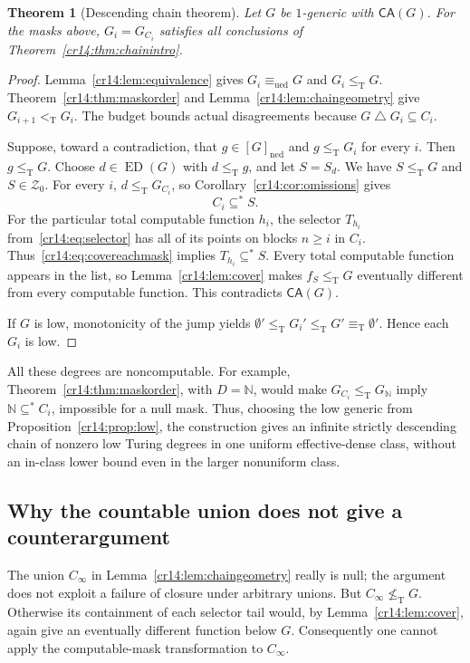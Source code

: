 \documentclass[11pt,a4paper]{article}
\newcommand{\N}{\mathbb N}
\newcommand{\leT}{\leq_{\mathrm T}}
\newcommand{\nleT}{\nleq_{\mathrm T}}
\newcommand{\eqT}{\equiv_{\mathrm T}}
\newcommand{\ltT}{<_{\mathrm T}}
\newcommand{\ned}{\mathrm{ned}}
\newcommand{\ued}{\mathrm{ued}}
\newcommand{\eqU}{\equiv_{\ued}}
\newcommand{\ED}{\operatorname{ED}}
\newcommand{\Znull}{\mathcal Z_0}
\newcommand{\substar}{\subseteq^{*}}
\newcommand{\symdiff}{\mathbin{\triangle}}
\newcommand{\jumpzero}{\emptyset'}
\newcommand{\CA}{\mathsf{CA}}
\newtheorem{theorem}{Theorem}[section]
\theoremstyle{definition}
\theoremstyle{remark}
\begin{document}
\begin{theorem}[Descending chain theorem]\label{cr14:thm:chain}
Let $G$ be $1$-generic with $\CA(G)$. For the masks above, $G_i=G_{C_i}$
satisfies all conclusions of Theorem~\ref{cr14:thm:chainintro}.
\end{theorem}
\begin{proof}
Lemma~\ref{cr14:lem:equivalence} gives $G_i\eqU G$ and $G_i\leT G$.
Theorem~\ref{cr14:thm:maskorder} and
Lemma~\ref{cr14:lem:chaingeometry} give $G_{i+1}\ltT G_i$. The budget bounds
actual disagreements because $G\symdiff G_i\subseteq C_i$.

Suppose, toward a contradiction, that $g\in[G]_{\ned}$ and
$g\leT G_i$ for every $i$. Then $g\leT G$. Choose
$d\in\ED(G)$ with $d\leT g$, and let $S=S_d$. We have $S\leT G$ and
$S\in\Znull$. For every $i$, $d\leT G_{C_i}$, so
Corollary~\ref{cr14:cor:omissions} gives
\begin{equation}\label{cr14:eq:covereachmask}
 C_i\substar S.
\end{equation}
For the particular total computable function $h_i$, the selector
$T_{h_i}$ from~\eqref{cr14:eq:selector} has all of its points on blocks $n\geq i$
in $C_i$. Thus~\eqref{cr14:eq:covereachmask} implies $T_{h_i}\substar S$.
Every total computable function appears in the list, so
Lemma~\ref{cr14:lem:cover} makes $f_S\leT G$ eventually different from every
computable function. This contradicts $\CA(G)$.

If $G$ is low, monotonicity of the jump yields
$\jumpzero\leT G_i'\leT G'\eqT\jumpzero$.
Hence each $G_i$ is low.
\end{proof}

All these degrees are noncomputable. For example,
Theorem~\ref{cr14:thm:maskorder}, with $D=\N$, would make
$G_{C_i}\leT G_\N$ imply $\N\substar C_i$, impossible for a null mask.
Thus, choosing the low generic from Proposition~\ref{cr14:prop:low}, the
construction gives an infinite strictly descending chain of nonzero low
Turing degrees in one uniform effective-dense class, without an in-class
lower bound even in the larger nonuniform class.

\subsection{Why the countable union does not give a counterargument}
The union $C_\infty$ in Lemma~\ref{cr14:lem:chaingeometry} really is null; the
argument does not exploit a failure of closure under arbitrary unions.
But $C_\infty\nleT G$. Otherwise its containment of each selector tail
would, by Lemma~\ref{cr14:lem:cover}, again give an eventually different
function below $G$. Consequently one cannot apply the computable-mask
transformation to $C_\infty$.
\end{document}
